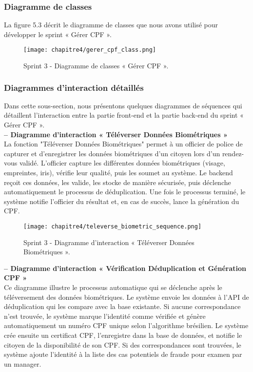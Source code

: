 \subsubsection{Diagramme de classes}
La figure 5.3 décrit le diagramme de classes que nous avons utilisé pour développer le sprint « Gérer CPF ».

\begin{figure}[H]
\centering
\texttt{[image: chapitre4/gerer\_cpf\_class.png]}
\caption{ Sprint 3 - Diagramme de classes « Gérer CPF ». }
\end{figure}

\subsubsection{Diagrammes d'interaction détaillés}
Dans cette sous-section, nous présentons quelques diagrammes de séquences qui détaillent
l'interaction entre la partie front-end et la partie back-end du sprint « Gérer CPF ».\\

\textbf{– Diagramme d'interaction « Téléverser Données Biométriques »}\\
La fonction "Téléverser Données Biométriques" permet à un officier de police de capturer et d'enregistrer les données biométriques d'un citoyen lors d'un rendez-vous validé. L'officier capture les différentes données biométriques (visage, empreintes, iris), vérifie leur qualité, puis les soumet au système. Le backend reçoit ces données, les valide, les stocke de manière sécurisée, puis déclenche automatiquement le processus de déduplication. Une fois le processus terminé, le système notifie l'officier du résultat et, en cas de succès, lance la génération du CPF.

\begin{figure}[H]
\centering
\texttt{[image: chapitre4/televerse\_biometric\_sequence.png]}
\caption{ Sprint 3 - Diagramme d'interaction « Téléverser Données Biométriques ». }
\end{figure}

\textbf{– Diagramme d'interaction « Vérification Déduplication et Génération CPF »}\\
Ce diagramme illustre le processus automatique qui se déclenche après le téléversement des données biométriques. Le système envoie les données à l'API de déduplication qui les compare avec la base existante. Si aucune correspondance n'est trouvée, le système marque l'identité comme vérifiée et génère automatiquement un numéro CPF unique selon l'algorithme brésilien. Le système crée ensuite un certificat CPF, l'enregistre dans la base de données, et notifie le citoyen de la disponibilité de son CPF. Si des correspondances sont trouvées, le système ajoute l'identité à la liste des cas potentiels de fraude pour examen par un manager.

